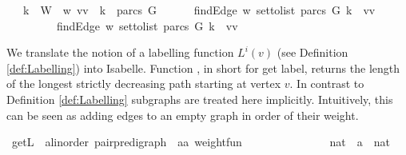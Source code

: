 \begin{isabellebody}
\ \ \ {\isachardoublequoteopen}k\ {\isasymin}\ W{\isachardoublequoteclose}\ \ {\isachardoublequoteopen}w\ {\isacharparenleft}vv\ {\isacharequal}\ k{\isachardoublequoteclose}\ \ {\isachardoublequoteopen}{\isacharparenleft}parcs\ G{\isacharparenright}\ {\isasymnoteq}\ {\isacharbraceleft}{\isacharbraceright}{\isachardoublequoteclose}\ \isanewline
\ \ \ {\isachardoublequoteopen}{\isacharparenleft}findEdge\ w\ {\isacharparenleft}set{\isacharunderscore}to{\isacharunderscore}list\ {\isacharparenleft}parcs\ G{\isacharparenright}{\isacharparenright}\ k{\isacharparenright}\ {\isacharequal}\ {\isacharparenleft}vv\ \isanewline
\ \ \ \ \ \ \ \ {\isasymor}\ {\isacharparenleft}findEdge\ w\ {\isacharparenleft}set{\isacharunderscore}to{\isacharunderscore}list\ {\isacharparenleft}parcs\ G{\isacharparenright}{\isacharparenright}\ k{\isacharparenright}\ {\isacharequal}\ {\isacharparenleft}vv%
\isadelimproof
%
\endisadelimproof
%
\isatagproof
%
\endisatagproof
{\isafoldproof}%
%
\isadelimproof
%
\endisadelimproof
%
\isadelimproof
%
\endisadelimproof
%
\isatagproof
%
\endisatagproof
{\isafoldproof}%
%
\isadelimproof
%
\endisadelimproof
%
\isadelimproof
%
\endisadelimproof
%
\isatagproof
%
\endisatagproof
{\isafoldproof}%
%
\isadelimproof
%
\endisadelimproof
%
\begin{isamarkuptext}%
We translate the notion of a labelling function $L^i(v)$ (see Definition \ref{def:Labelling}) into Isabelle.
Function , in short for get label, returns the length of the longest strictly decreasing
path starting at vertex $v$. In contrast to Definition \ref{def:Labelling} subgraphs are treated here implicitly. Intuitively,
this can be seen as adding edges to an empty graph in order of their weight.%
\end{isamarkuptext}\isamarkuptrue%
\isamarkupfalse%
\ getL\ {\isacharcolon}{\isacharcolon}\ {\isachardoublequoteopen}{\isacharparenleft}{\isacharprime}a{\isacharcolon}{\isacharcolon}linorder{\isacharparenright}\ pair{\isacharunderscore}pre{\isacharunderscore}digraph\ {\isasymRightarrow}\ {\isacharparenleft}{\isacharprime}a{\isasymtimes}{\isacharprime}a{\isacharparenright}\ weight{\isacharunderscore}fun\ \isanewline
\ \ \ \ \ \ \ \ \ \ \ \ \ {\isasymRightarrow}\ nat\ {\isasymRightarrow}\ {\isacharprime}a\ {\isasymRightarrow}\ nat{\isachardoublequoteclose}\ \isanewline

\end{isabellebody}
